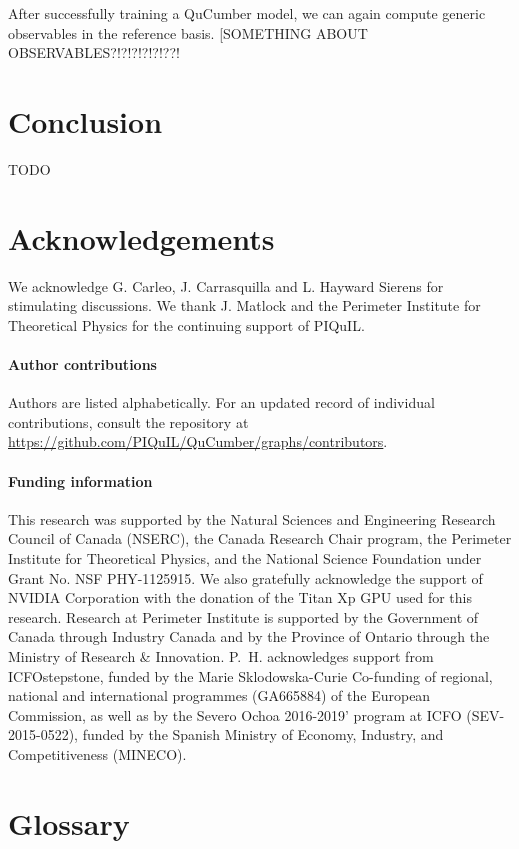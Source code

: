 \documentclass[submission, Phys, hidelnks]{SciPost}
\newcommand{\red}[1]{{\color{red} #1}}
\begin{document}
After successfully training a QuCumber model, we can again compute generic observables in the reference basis. 
\red{[SOMETHING ABOUT OBSERVABLES?!?!?!?!?!??!}

\section{Conclusion}
\red{TODO}

\section*{Acknowledgements}
We acknowledge G. Carleo, J. Carrasquilla and L. Hayward Sierens for stimulating discussions. 
We thank J. Matlock and the Perimeter Institute for Theoretical Physics for the continuing support of PIQuIL.

\paragraph{Author contributions}
Authors are listed alphabetically. For an updated record of individual contributions, consult the repository at \url{https://github.com/PIQuIL/QuCumber/graphs/contributors}.

\paragraph{Funding information}

This research was supported by the Natural Sciences and Engineering
Research Council of Canada (NSERC), the
Canada Research Chair program, the Perimeter Institute
for Theoretical Physics, and the National Science Foundation
under Grant No. NSF PHY-1125915. We also gratefully
acknowledge the support of NVIDIA Corporation with
the donation of the Titan Xp GPU used for this research.
Research at Perimeter Institute is supported by the Government
of Canada through Industry Canada and by the
Province of Ontario through the Ministry of Research \&
Innovation. P.~H. acknowledges support from ICFOstepstone, funded by the Marie Sklodowska-Curie Co-funding of regional, national and international programmes (GA665884) of the European Commission, as well as by the Severo Ochoa 2016-2019' program at ICFO (SEV-2015-0522), funded by the Spanish Ministry of Economy, Industry, and Competitiveness (MINECO).


\appendix
\section{Glossary}
\label{Glossary}
\end{document}
